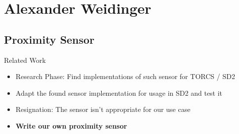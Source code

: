 \documentclass{beamer}
\begin{document}
  \section{Alexander Weidinger}
  \subsection{Proximity Sensor}
  \begin{frame}{Related Work}
    \begin{itemize}
      \item<1-> Research Phase: Find implementations of such sensor for TORCS / SD2
      \item<2-> Adapt the found sensor implementation for usage in SD2 and test it
      \item<3-> Resignation: The sensor isn't appropriate for our use case
      \item<4-> \textbf{Write our own proximity sensor}
    \end{itemize}
  \end{frame}
\end{document}
